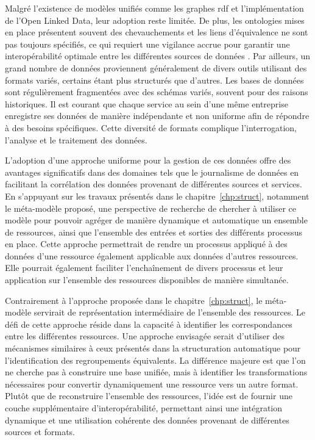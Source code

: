 Malgré l'existence de modèles unifiés comme les graphes \gls{rdf} et l'implémentation de l'Open Linked Data, leur adoption reste limitée.
De plus, les ontologies mises en place présentent souvent des chevauchements et les liens d'équivalence ne sont pas toujours spécifiés, ce qui requiert une vigilance accrue pour garantir une interopérabilité optimale entre les différentes sources de données \cite{rulaDataQualityIssues2016}.
Par ailleurs, un grand nombre de données proviennent généralement de divers outils utilisant des formats variés, certains étant plus structurés que d'autres.
Les bases de données sont régulièrement fragmentées avec des schémas variés, souvent pour des raisons historiques.
Il est courant que chaque service au sein d'une même entreprise enregistre ses données de manière indépendante et non uniforme afin de répondre à des besoins spécifiques.
Cette diversité de formats complique l'interrogation, l'analyse et le traitement des données.

L'adoption d'une approche uniforme pour la gestion de ces données offre des avantages significatifs dans des domaines tels que le journalisme de données en facilitant la corrélation des données provenant de différentes sources et services.
En s'appuyant sur les travaux présentés dans le chapitre~\ref{chp:struct}, notamment le méta-modèle proposé, une perspective de recherche de chercher à utiliser ce modèle pour pouvoir agréger de manière dynamique et automatique un ensemble de ressources, ainsi que l'ensemble des entrées et sorties des différents processus en place.
Cette approche permettrait de rendre un processus appliqué à des données d'une ressource également applicable aux données d'autres ressources.
Elle pourrait également faciliter l'enchaînement de divers processus et leur application sur l'ensemble des ressources disponibles de manière simultanée.

Contrairement à l'approche proposée dans le chapitre~\ref{chp:struct}, le méta-modèle servirait de représentation intermédiaire de l'ensemble des ressources.
Le défi de cette approche réside dans la capacité à identifier les correspondances entre les différentes ressources.
Une approche envisagée serait d'utiliser des mécanismes similaires à ceux présentés dans la structuration automatique pour l'identification des regroupements équivalents.
La différence majeure est que l'on ne cherche pas à construire une base unifiée, mais à identifier les transformations nécessaires pour convertir dynamiquement une ressource vers un autre format.
Plutôt que de reconstruire l'ensemble des ressources, l'idée est de fournir une couche supplémentaire d'interopérabilité, permettant ainsi une intégration dynamique et une utilisation cohérente des données provenant de différentes sources et formats.

